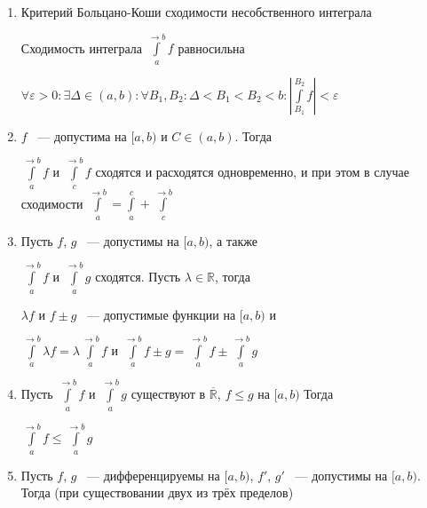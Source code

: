\documentclass{article}
\begin{document}
            \begin{enumerate}
            
                \item Критерий Больцано-Коши сходимости несобственного интеграла
                
                    Сходимость интеграла $\int\limits^{\rightarrow b}_a f$ равносильна 
                    
                    $\forall \varepsilon > 0 : \exists \Delta \in (a, b) : \forall B_1, B_2 : \Delta < B_1 < B_2 < b : \left| \int\limits^{B_2}_{B_1} f \right| < \varepsilon$
                    
                \item $f$ ~--- допустима на $[a, b)$ и $C \in (a, b)$. Тогда
                
                    $\int\limits^{\rightarrow b}_a f$ и $\int\limits^{\rightarrow b}_c f$ сходятся и расходятся одновременно, и при этом в случае сходимости $\int\limits^{\rightarrow b}_a = \int\limits^c_a + \int\limits^{\rightarrow b}_c$
                    
                \item Пусть $f$, $g$ ~--- допустимы на $[a, b)$, а также
                
                    $\int\limits^{\rightarrow b}_a f$ и $\int\limits^{\rightarrow b}_a g$ сходятся. Пусть $\lambda \in \mathbb{R}$, тогда
                    
                    $\lambda f$ и $f \pm g$ ~--- допустимые функции на $[a, b)$ и
                    
                    $\int\limits^{\rightarrow b}_a \lambda f = \lambda \int\limits^{\rightarrow b}_a f$ и $\int\limits^{\rightarrow b}_a f \pm g = \int\limits^{\rightarrow b}_a f \pm \int\limits^{\rightarrow b}_a g$
                    
                \item Пусть $\int\limits^{\rightarrow b}_a f$ и $\int\limits^{\rightarrow b}_a g$ существуют в $\overline{\mathbb{R}}$, $f \leq g$ на $[a, b)$ Тогда
                
                    $\int\limits^{\rightarrow b}_a f \leq \int\limits^{\rightarrow b}_a g$
                    
                \item Пусть $f$, $g$ ~--- дифференцируемы на $[a, b)$, $f'$, $g'$ ~--- допустимы на $[a, b)$. Тогда (при существовании двух из трёх пределов)
                

\end{enumerate}
\end{document}
